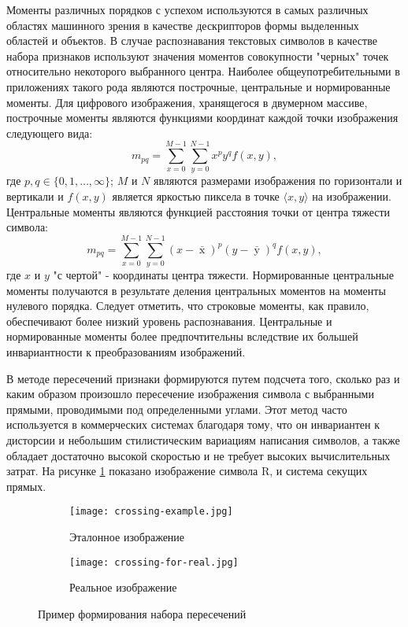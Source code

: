 Моменты различных порядков с успехом используются в самых различных областях машинного зрения в качестве дескрипторов формы выделенных областей и объектов. В случае распознавания текстовых символов в качестве набора признаков используют значения моментов совокупности "черных" точек относительно некоторого выбранного центра. Наиболее общеупотребительными в приложениях такого рода являются построчные, центральные и нормированные моменты.
Для цифрового изображения, хранящегося в двумерном массиве, построчные моменты являются функциями координат каждой точки изображения следующего вида: $$ m_{pq} =\sum\limits_{x=0}^{M-1} {\sum\limits_{y=0}^{N-1} {x^py^qf(x,y)} } , $$ где $p,q \in \{0,1,\ldots ,\infty \}$; $M$ и $N$ являются размерами изображения по горизонтали и вертикали и $f(x,y)$ является яркостью пиксела в точке $\langle x,y\rangle$ на изображении.
Центральные моменты являются функцией расстояния точки от центра тяжести символа: $$ m_{pq} =\sum\limits_{x=0}^{M-1} {\sum\limits_{y=0}^{N-1} {(x-\mathop x\limits^\_ )^p(y-\mathop y\limits^\_ )^qf(x,y)} } , $$ где $x$ и $y$ "с чертой" - координаты центра тяжести.
Нормированные центральные моменты получаются в результате деления центральных моментов на моменты нулевого порядка.
Следует отметить, что строковые моменты, как правило, обеспечивают более низкий уровень распознавания. Центральные и нормированные моменты более предпочтительны вследствие их большей инвариантности к преобразованиям изображений.

В методе пересечений признаки формируются путем подсчета того, сколько раз и каким образом произошло пересечение изображения символа с выбранными прямыми, проводимыми под определенными углами. Этот метод часто используется в коммерческих системах благодаря тому, что он инвариантен к дисторсии и небольшим стилистическим вариациям написания символов, а также обладает достаточно высокой скоростью и не требует высоких вычислительных затрат. На рисунке \ref{fig:domain:recognition:statistic_analisys:crossing_list} показано изображение символа R, и система секущих прямых.

\begin{figure}[ht]
\centering
  \begin{subfigure}[b]{0.4\textwidth} 
    \centering
    \texttt{[image: crossing-example.jpg]}  
    \caption{Эталонное изображение}
  \end{subfigure}
  \begin{subfigure}[b]{0.4\textwidth} 
    \centering
    \texttt{[image: crossing-for-real.jpg]}  
    \caption{Реальное изображение}
  \end{subfigure}
  \caption{Пример формирования набора пересечений}
  \label{fig:domain:recognition:statistic_analisys:crossing_list}
\end{figure}

